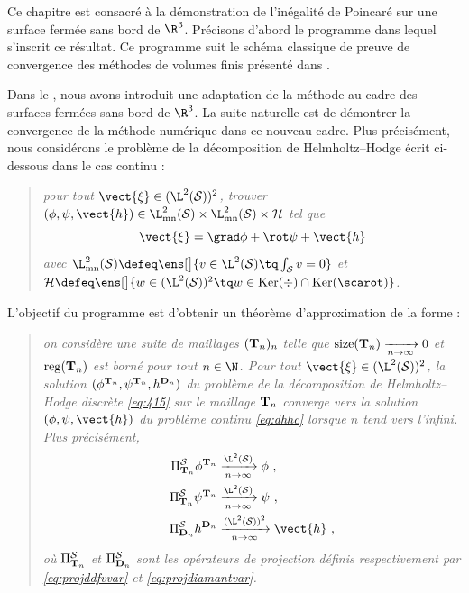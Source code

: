 Ce chapitre est consacré à la démonstration de l'inégalité de Poincaré \ddfv sur une surface fermée sans bord de $\R^3$. Précisons d'abord le programme dans lequel s'inscrit ce résultat. Ce programme suit le schéma classique de preuve de convergence des méthodes de volumes finis présenté dans \cite{eymard_finite_2000-1}.

Dans le , nous avons introduit une adaptation de la méthode \ddfv au cadre des surfaces fermées sans bord de $\R^3$. La suite naturelle est de démontrer la convergence de la méthode numérique dans ce nouveau cadre. Plus précisément, nous considérons le problème de la décomposition de Helmholtz--Hodge écrit ci-dessous dans le cas continu :
\begin{quote}
\textsl{pour tout $\vect{\xi} \in (\L^2(\surflisse))^2$, trouver $(\phi, \psi, \vect{h}) \in \L^2_\mathrm{mn}(\surflisse) \times \L^2_\mathrm{mn}(\surflisse) \times \mathcal{H}$ tel que
\begin{equation} \label{eq:dhhc}
    \vect{\xi} = \grad \phi + \rot \psi + \vect{h}
\end{equation}
avec $\L^2_\mathrm{mn}(\surflisse) \defeq \ens[\big]{v \in \L^2(\surflisse) \tq \int_\surflisse v = 0}$ et $\mathcal{H} \defeq \ens[\big]{w \in (\L^2(\surflisse))^2 \tq w \in \Ker(\div) \cap \Ker(\scarot)}$.
}
\end{quote}
L'objectif du programme est d'obtenir un théorème d'approximation de la forme :
\begin{quote}
\textsl{on considère une suite de maillages $(\mathbf{T}_n)_n$ telle que $\operatorname{size}(\mathbf{T}_n) \xrightarrow[n \to \infty]{} 0$ et $\operatorname{reg}(\mathbf{T}_n)$ est borné pour tout $n \in \N$. Pour tout $\vect{\xi} \in (\L^2(\surflisse))^2$, la solution $(\phi^{\mathbf{T}_n}, \psi^{\mathbf{T}_n}, h^{\mathbf{D}_n})$ du problème de la décomposition de Helmholtz--Hodge discrète \ref{eq:415} sur le maillage $\mathbf{T}_n$ converge vers la solution $(\phi, \psi, \vect{h})$ du problème continu \ref{eq:dhhc} lorsque $n$ tend vers l'infini. Plus précisément,
\begin{subequations}
\begin{align}
    \Pi^\surflisse_{\ensddfvplat_n} \phi^{\ensddfvplat_n} &\xrightarrow[n \to \infty]{\L^2(\surflisse)} \phi\ , \\
    \Pi^\surflisse_{\ensddfvplat_n} \psi^{\ensddfvplat_n} &\xrightarrow[n \to \infty]{\L^2(\surflisse)} \psi\ , \\
    \Pi^\surflisse_{\ensdiamantplat_n} h^{\ensdiamantplat_n} &\xrightarrow[n \to \infty]{(\L^2(\surflisse))^2} \vect{h}\ ,
\end{align}
\end{subequations}
où $\Pi^{\mathcal{S}}_{\mathbf{T}_n}$ et $\Pi^{\mathcal{S}}_{\mathbf{D}_n}$ sont les opérateurs de projection définis respectivement par \ref{eq:projddfvvar} et \ref{eq:projdiamantvar}.
}
\end{quote}
